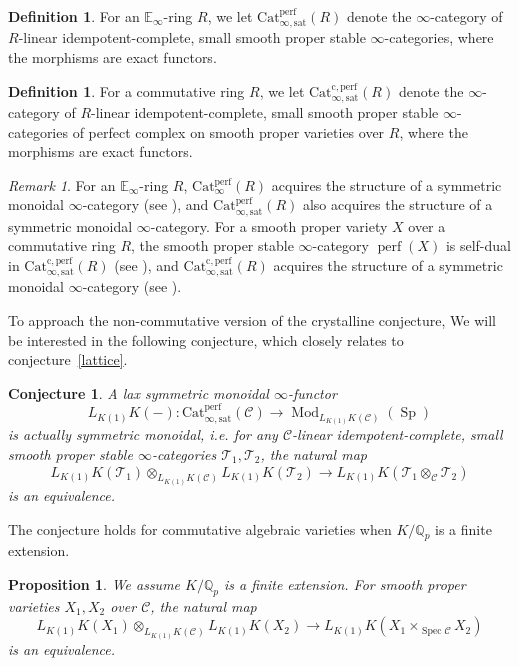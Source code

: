 \documentclass[11pt]{amsart}
\newcommand{\Q}{\mathbb{Q}}
\newcommand{\sC}{\mathcal{C}}
\newcommand{\sT}{\mathcal{T}}
\newcommand{\perf}{\operatorname{perf}}
\newcommand{\Spec}{\operatorname{Spec}}
\newcommand{\Cat}{\operatorname{Cat_{\infty}^{perf}}}
\newcommand{\Catsat}{\operatorname{Cat_{\infty,sat}^{perf}}}
\newcommand{\Catcsat}{\operatorname{Cat_{\infty,sat}^{c,perf}}}
\newcommand{\Sp}{\operatorname{Sp}}
\newtheorem{prop}[lemma]{Proposition}
\newtheorem{conj}[lemma]{Conjecture}
\theoremstyle{definition}
\newtheorem{defn}[lemma]{Definition}
\theoremstyle{remark}
\newtheorem{remark}[lemma]{Remark}
\numberwithin{equation}{section}
\begin{document}
\begin{defn}
For an $\mathbb{E}_\infty$-ring $R$, we let $\Catsat (R)$ denote the $\infty$-category of $R$-linear idempotent-complete, small smooth proper stable $\infty$-categories, where the morphisms are exact functors. 
\end{defn}
\begin{defn}
  For a commutative ring $R$, we let $\Catcsat (R)$ denote the $\infty$-category of $R$-linear idempotent-complete, small smooth proper stable $\infty$-categories of perfect complex on smooth proper varieties over $R$, where the morphisms are exact functors.
\end{defn}
\begin{remark}
For an $\mathbb{E}_\infty$-ring $R$, $\Cat (R)$ acquires the structure of a symmetric monoidal $\infty$-category (see \cite[Appendix D.2.2]{Lurie17}), and $\Catsat (R)$ also acquires the structure of a symmetric monoidal $\infty$-category. For a smooth proper variety $X$ over a 
 commutative ring $R$, the smooth proper stable $\infty$-category $\perf(X)$ is self-dual in $\Catcsat (R)$ (see \cite[Corollary 9.4.3.4.]{Lurie17}), and $\Catcsat (R)$ acquires the structure of a symmetric monoidal $\infty$-category (see \cite[Corollary 9.4.3.8]{Lurie17}).
\end{remark}
To approach the non-commutative version of the crystalline conjecture, We will be interested in the following conjecture, which closely relates to conjecture~\ref{lattice}. 
\begin{conj}\label{kunnethK1}
A lax symmetric monoidal $\infty$-functor
\[
L_{K(1)}K(-):\Catsat(\sC) \to {\operatorname{Mod}}_{L_{K(1)}K(\sC)}(\Sp)
\]
is actually symmetric monoidal, i.e. for any $\sC$-linear idempotent-complete, small smooth proper stable $\infty$-categories $\sT_1,\sT_2$, the natural map 
\[
L_{K(1)}K(\sT_1) \otimes_{L_{K(1)}K(\sC)} L_{K(1)}K(\sT_2) \to L_{K(1)}K(\sT_1\otimes_\sC \sT_2)
\]
is an equivalence.
\end{conj}
 The conjecture holds for commutative algebraic varieties when $K/\Q_p$ is a finite extension.
\begin{prop}\label{commkunnethK1}
  We assume $K/\Q_p$ is a finite extension. For smooth proper varieties $X_1,X_2$ over $\sC$, the natural map 
\[
L_{K(1)}K(X_1) \otimes_{L_{K(1)}K(\sC)} L_{K(1)}K(X_2) \to L_{K(1)}K(X_1\times_{\Spec \sC} X_2)
\]
is an equivalence.
\end{prop}
\end{document}
